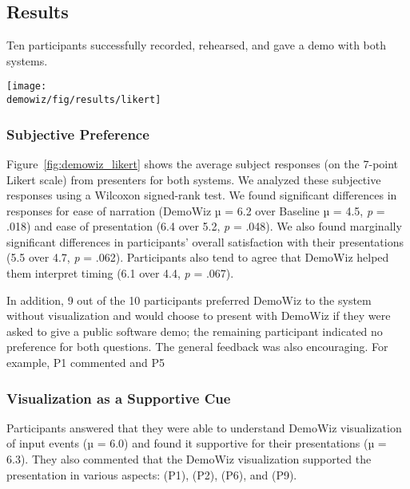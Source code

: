 
\subsection{Results}
Ten participants successfully recorded, rehearsed, and gave a demo with both systems.

\begin{figure*}[b!]
  \centering
  \texttt{[image: \\demowiz/fig/results/likert]}
  \caption{User feedback from questionnaire on the 7-point Likert scale.}
  \label{fig:demowiz_likert}
\end{figure*}

\subsubsection{Subjective Preference}
Figure~\ref{fig:demowiz_likert} shows the average subject responses (on the 7-point Likert scale) from presenters for both systems. We analyzed these subjective responses using a Wilcoxon signed-rank test. We found significant differences in responses for ease of narration (DemoWiz µ = 6.2 over Baseline µ = 4.5, \textit{p} = .018) and ease of presentation (6.4 over 5.2, \textit{p} = .048). We also found marginally significant differences in participants' overall satisfaction with their presentations (5.5 over 4.7, \textit{p} = .062). Participants also tend to agree that DemoWiz helped them interpret timing (6.1 over 4.4, \textit{p} = .067).

In addition, 9 out of the 10 participants preferred DemoWiz to the system without visualization and would choose to present with DemoWiz if they were asked to give a public software demo; the remaining participant indicated no preference for both questions. The general feedback was also encouraging. For example, P1 commented  and P5 

\subsubsection{Visualization as a Supportive Cue}
Participants answered that they were able to understand DemoWiz visualization of input events (µ = 6.0) and found it supportive for their presentations (µ = 6.3). They also commented that the DemoWiz visualization supported the presentation in various aspects:  (P1),  (P2),  (P6), and  (P9).

